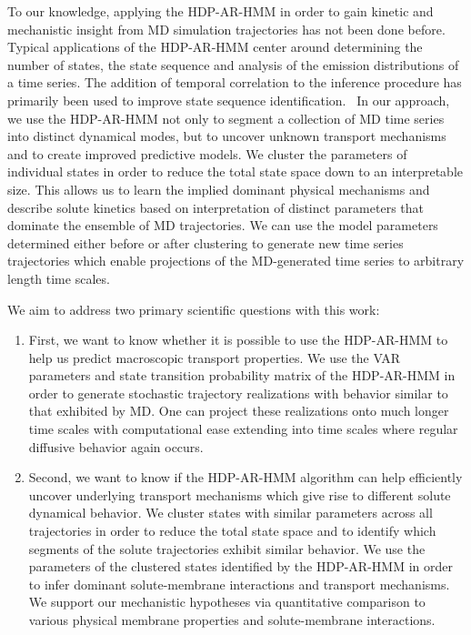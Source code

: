\documentclass[journal=jpcbfk,manuscript=article]{achemso}
\begin{document}
  To our knowledge, applying the HDP-AR-HMM in order to gain kinetic and
  mechanistic insight from MD simulation trajectories has not been done
  before. Typical applications of the HDP-AR-HMM center around determining the 
  number of states, the state sequence and analysis of the emission 
  distributions of a time series. The addition of temporal correlation to 
  the inference procedure has primarily been used to improve state sequence 
  identification.~\cite{calderon_inferring_2015} In our approach, we use the
  HDP-AR-HMM not only to segment a collection of MD time series into distinct 
  dynamical modes, but to uncover unknown transport mechanisms and to create 
  improved predictive models. We cluster the parameters of individual states
  in order to reduce the total state space down to an interpretable size.
  This allows us to learn the implied dominant physical mechanisms and describe
  solute kinetics based on interpretation of distinct parameters that dominate
  the ensemble of MD trajectories. We can use the model parameters determined 
  either before or after clustering to generate new time series trajectories 
  which enable projections of the MD-generated time series to arbitrary length
  time scales.
  
  We aim to address two primary scientific questions with this work:
  \begin{enumerate}
  
  \item First, we want to know whether it is possible to use the HDP-AR-HMM to 
  help us predict macroscopic transport properties. We use the VAR parameters
  and state transition probability matrix of the HDP-AR-HMM in order to 
  generate stochastic trajectory realizations with behavior similar to that
  exhibited by MD. One can project these realizations onto much longer 
  time scales with computational ease extending into time scales where 
  regular diffusive behavior again occurs.
  
  \item Second, we want to know if the HDP-AR-HMM algorithm can help
  efficiently uncover underlying transport mechanisms which give rise to different 
  solute dynamical behavior. We cluster 
  states with similar parameters
  across all
  trajectories in order to reduce the total state space and to 
  identify
  which
  segments of the solute trajectories exhibit similar behavior. We use the 
  parameters of the clustered states identified by the HDP-AR-HMM in order to 
  infer dominant solute-membrane interactions and transport mechanisms. We 
  support our mechanistic hypotheses via quantitative comparison to various 
  physical membrane properties and solute-membrane interactions.
  
  \end{enumerate}
\end{document}
